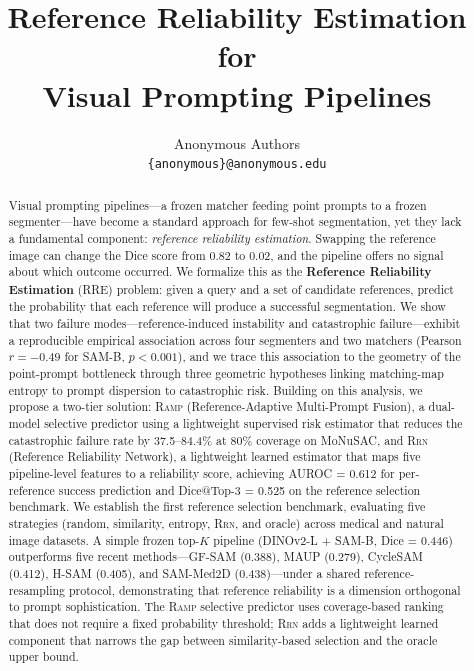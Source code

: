 \documentclass[10pt,twocolumn,letterpaper]{article}
\title{\Large\bf Reference Reliability Estimation for\\Visual Prompting Pipelines}
\author{Anonymous Authors\\[2pt]
\texttt{\{anonymous\}@anonymous.edu}}
\date{}
\newcommand{\RAMP}{\textsc{Ramp}}
\newcommand{\RRN}{\textsc{Rrn}}
\begin{document}
\maketitle

\begin{abstract}
Visual prompting pipelines---a frozen matcher feeding point prompts to a
frozen segmenter---have become a standard approach for few-shot
segmentation, yet they lack a fundamental component: \emph{reference
reliability estimation}. Swapping the reference image can change the Dice
score from 0.82 to 0.02, and the pipeline offers no signal about which
outcome occurred. We formalize this as the \textbf{Reference Reliability
Estimation} (RRE) problem: given a query and a set of candidate references,
predict the probability that each reference will produce a successful
segmentation. We show that two failure
modes---reference-induced instability and catastrophic failure---exhibit a
reproducible empirical association across four segmenters and two matchers
(Pearson $r=-0.49$ for SAM-B, $p<0.001$), and we trace this
association to the geometry of the point-prompt bottleneck through
three geometric hypotheses linking matching-map entropy to prompt dispersion
to catastrophic risk. Building on this analysis, we propose a
two-tier solution: \RAMP{} (Reference-Adaptive Multi-Prompt Fusion), a
dual-model selective predictor using a lightweight supervised risk estimator
that reduces the catastrophic failure rate by 37.5--84.4\% at 80\% coverage
on MoNuSAC, and \RRN{} (Reference Reliability Network), a lightweight learned
estimator that maps five pipeline-level features to a reliability
score, achieving AUROC = 0.612 for per-reference success prediction and
Dice@Top-3 = 0.525 on the reference selection benchmark. We establish the
first reference selection benchmark, evaluating five strategies (random,
similarity, entropy, \RRN{}, and oracle) across medical and natural image
datasets. A simple frozen top-$K$ pipeline (DINOv2-L + SAM-B, Dice = 0.446)
outperforms five recent methods---GF-SAM (0.388), MAUP
(0.279), CycleSAM (0.412), H-SAM (0.405), and SAM-Med2D (0.438)---under
a shared reference-resampling protocol, demonstrating that reference reliability
is a dimension orthogonal to prompt sophistication. The
\RAMP{} selective predictor uses coverage-based ranking that does not require
a fixed probability threshold; \RRN{} adds a lightweight learned component that narrows the
gap between similarity-based selection and the oracle upper bound.
\end{abstract}
\end{document}
